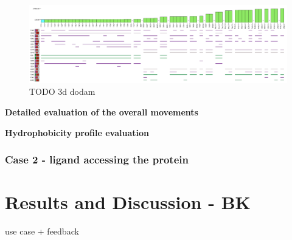 \documentclass[twocolumn]{bmcart}%
\begin{document}
\begin{figure}[htb]
	\centering
  \includegraphics[width=0.95\linewidth]{img/case_hydro_vs_dist_3d.png}
  \caption{\label{fig:case_hydro_vs_dist_3d} {\color{red}TODO} 3d dodam}
\end{figure}

 


\vspace{5mm}\noindent\textbf{Detailed evaluation of the overall movements}









\vspace{5mm}\noindent\textbf{Hydrophobicity profile evaluation}












 



\subsubsection{Case 2 - ligand accessing the protein}
\label{sec:case2}
  



\section*{Results and Discussion - BK}
use case + feedback
\end{document}
